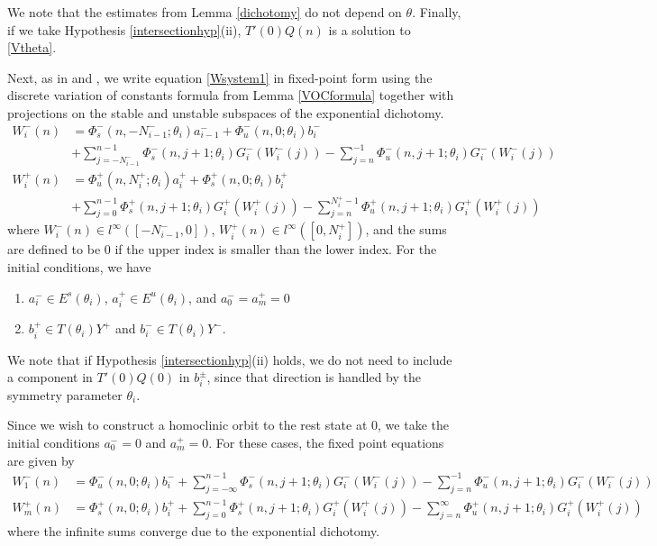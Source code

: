 \documentclass[12pt]{article}
\begin{document}
We note that the estimates from Lemma \ref{dichotomy} do not depend on $\theta$. Finally, if we take Hypothesis \ref{intersectionhyp}(ii), $T'(0) Q(n)$ is a solution to \eqref{Vtheta}.

Next, as in \cite{Sandstede1997} and \cite{Knobloch2000}, we write equation \eqref{Wsystem1} in fixed-point form using the discrete variation of constants formula from Lemma \ref{VOCformula} together with projections on the stable and unstable subspaces of the exponential dichotomy.
\begin{equation}\label{FPeqs1}
\begin{aligned}
W_i^-(n) &= 
\Phi_s^-(n, -N_{i-1}^-; \theta_i) a_{i-1}^- + \Phi_u^-(n, 0; \theta_i) b_i^-  \\
&+ \sum_{j = -N_{i-1}^-}^{n-1} \Phi_s^-(n, j+1; \theta_i) G_i^-(W_i^-(j)) - \sum_{j = n}^{-1} \Phi_u^-(n, j+1; \theta_i) G_i^-(W_i^-(j)) \\
W_i^+(n) &= \Phi_u^+(n, N_i^+; \theta_i) a_i^+ + \Phi_s^+(n, 0; \theta_i) b_i^+ \\
&+ \sum_{j = 0}^{n-1} \Phi_s^+(n, j+1; \theta_i) G_i^+(W_i^+(j)) 
- \sum_{j = n}^{N_i^+-1} \Phi_u^+(n, j+1; \theta_i) G_i^+(W_i^+(j))
\end{aligned}
\end{equation}
where $W_i^-(n) \in l^\infty([-N_{i-1}^-, 0])$, $W_i^+(n) \in l^\infty([0, N_i^+])$, and the sums are defined to be $0$ if the upper index is smaller than the lower index. For the initial conditions, we have
\begin{enumerate}
\item $a_i^- \in E^s(\theta_i)$, $a_i^+ \in E^u(\theta_i)$, and $a_0^- = a_m^+ = 0$
\item $b_i^+ \in T(\theta_i) Y^+$ and $b_i^- \in T(\theta_i) Y^-$.
\end{enumerate}
We note that if Hypothesis \ref{intersectionhyp}(ii) holds, we do not need to include a component in $T'(0) Q(0)$ in $b_i^\pm$, since that direction is handled by the symmetry parameter $\theta_i$.

Since we wish to construct a homoclinic orbit to the rest state at 0, we take the initial conditions $a_0^- = 0$ and $a_m^+ = 0$. For these cases, the fixed point equations are given by
\begin{align*}
W_1^-(n) &= \Phi_u^-(n, 0; \theta_i) b_i^- 
+ \sum_{j = -\infty}^{n-1} \Phi_s^-(n, j+1; \theta_i) G_i^-(W_i^-(j)) - \sum_{j = n}^{-1} \Phi_u^-(n, j+1; \theta_i) G_i^-(W_i^-(j)) \\
W_m^+(n) &= \Phi_s^+(n, 0; \theta_i) b_i^+ 
+ \sum_{j = 0}^{n-1} \Phi_s^+(n, j+1; \theta_i) G_i^+(W_i^+(j)) 
- \sum_{j = n}^\infty \Phi_u^+(n, j+1; \theta_i) G_i^+(W_i^+(j))
\end{align*}
where the infinite sums converge due to the exponential dichotomy. 
\end{document}
